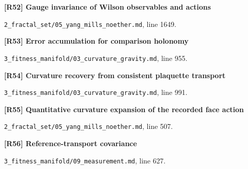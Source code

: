 \documentclass[11pt,a4paper]{article}
\begin{document}
\par\medskip\noindent\begin{minipage}{\linewidth}\textbf{[R52] Gauge invariance of Wilson observables and actions}\label{src:thm-wilson-action-gauge-invariance}\par
{\small\texttt{}\par
\nolinkurl{2_fractal_set/05_yang_mills_noether.md}, line 1649.\par}
\end{minipage}\par

\par\medskip\noindent\begin{minipage}{\linewidth}\textbf{[R53] Error accumulation for comparison holonomy}\label{src:lem-regge-holonomy-approx}\par
{\small\texttt{}\par
\nolinkurl{3_fitness_manifold/03_curvature_gravity.md}, line 955.\par}
\end{minipage}\par

\par\medskip\noindent\begin{minipage}{\linewidth}\textbf{[R54] Curvature recovery from consistent plaquette transport}\label{src:thm-riemann-scutoid}\par
{\small\texttt{}\par
\nolinkurl{3_fitness_manifold/03_curvature_gravity.md}, line 991.\par}
\end{minipage}\par

\par\medskip\noindent\begin{minipage}{\linewidth}\textbf{[R55] Quantitative curvature expansion of the recorded face action}\label{src:lem-ym-recorded-face-action-remainder}\par
{\small\texttt{}\par
\nolinkurl{2_fractal_set/05_yang_mills_noether.md}, line 507.\par}
\end{minipage}\par

\par\medskip\noindent\begin{minipage}{\linewidth}\textbf{[R56] Reference-transport covariance}\label{src:lem-reference-transport-covariance}\par
{\small\texttt{}\par
\nolinkurl{3_fitness_manifold/09_measurement.md}, line 627.\par}
\end{minipage}\par
\end{document}
